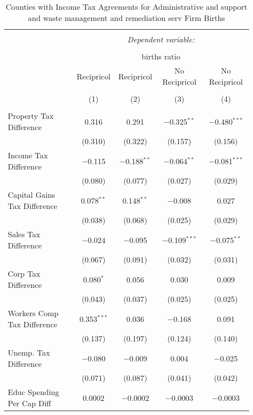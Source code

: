 
\begin{table}[!htbp] \centering 
  \caption{Counties with Income Tax Agreements for  Administrative and support and waste management and remediation serv Firm Births} 
  \label{56rd} 
\begin{tabular}{@{\extracolsep{5pt}}lcccc} 
\\[-1.8ex]\hline 
\hline \\[-1.8ex] 
 & \multicolumn{4}{c}{\textit{Dependent variable:}} \\ 
\cline{2-5} 
\\[-1.8ex] & \multicolumn{4}{c}{births ratio} \\ 
 & Recipricol & Recipricol & No Recipricol & No Recipricol \\ 
\\[-1.8ex] & (1) & (2) & (3) & (4)\\ 
\hline \\[-1.8ex] 
 Property Tax Difference & 0.316 & 0.291 & $-$0.325$^{**}$ & $-$0.480$^{***}$ \\ 
  & (0.310) & (0.322) & (0.157) & (0.156) \\ 
  Income Tax Difference & $-$0.115 & $-$0.188$^{**}$ & $-$0.064$^{**}$ & $-$0.081$^{***}$ \\ 
  & (0.080) & (0.077) & (0.027) & (0.029) \\ 
  Capital Gains Tax Difference & 0.078$^{**}$ & 0.148$^{**}$ & $-$0.008 & 0.027 \\ 
  & (0.038) & (0.068) & (0.025) & (0.029) \\ 
  Sales Tax Difference & $-$0.024 & $-$0.095 & $-$0.109$^{***}$ & $-$0.075$^{**}$ \\ 
  & (0.067) & (0.091) & (0.032) & (0.031) \\ 
  Corp Tax Difference & 0.080$^{*}$ & 0.056 & 0.030 & 0.009 \\ 
  & (0.043) & (0.037) & (0.025) & (0.025) \\ 
  Workers Comp Tax Difference & 0.353$^{***}$ & 0.036 & $-$0.168 & 0.091 \\ 
  & (0.137) & (0.197) & (0.124) & (0.140) \\ 
  Unemp. Tax Difference & $-$0.080 & $-$0.009 & 0.004 & $-$0.025 \\ 
  & (0.071) & (0.087) & (0.041) & (0.042) \\ 
  Educ Spending Per Cap Diff & 0.0002 & $-$0.0002 & $-$0.0003 & $-$0.0003 \\ 

\end{tabular}
\end{table}
